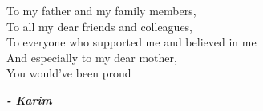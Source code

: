 
\begin{fquote}
\begin{center}
\large{

\uppercase{T}o my father and my family members,\\[12pt]
\uppercase{T}o all my dear friends and colleagues,\\[12pt]
\uppercase{T}o everyone who supported me and believed in me\\[12pt]
\uppercase{A}nd especially to my dear mother, \\[12pt]
\uppercase{Y}ou would've been proud\\[12pt]
}
\end{center}
\bigskip
\medskip
\end{fquote}

\begin{adjustwidth}{2cm}{1cm}
\hspace*{\fill} \textbf{\textit{\large{- Karim}}}
\end{adjustwidth}

\clearpage